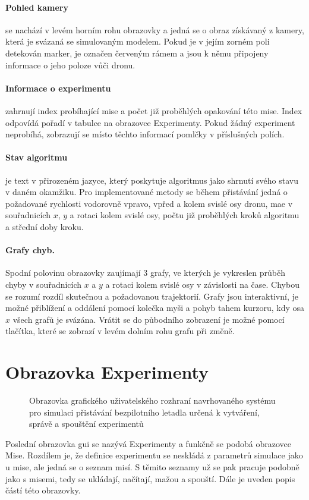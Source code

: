         \paragraph{ Pohled kamery} se nachází v levém horním rohu obrazovky a jedná se o obraz získávaný z kamery, která je svázaná se simulovaným modelem. Pokud je v jejím zorném poli detekován marker, je označen červeným rámem a jsou k němu připojeny informace o jeho poloze vůči dronu.

        \paragraph{ Informace o experimentu} zahrnují index probíhající mise a počet již proběhlých opakování této mise. Index odpovídá pořadí v tabulce na obrazovce Experimenty. Pokud žádný experiment neprobíhá, zobrazují se místo těchto informací pomlčky v příslušných polích.

        \paragraph{ Stav algoritmu} je text v přirozeném jazyce, který poskytuje algoritmus jako shrnutí svého stavu v daném okamžiku. Pro implementované metody se během přistávání jedná o požadované rychlosti vodorovně vpravo, vpřed a kolem svislé osy dronu, \acrshort{mae} v souřadnicích $x$, $y$ a rotaci kolem svislé osy, počtu již proběhlých kroků algoritmu a střední doby kroku.

        \paragraph{ Grafy chyb.} Spodní polovinu obrazovky zaujímají 3 grafy, ve kterých je vykreslen průběh chyby v souřadnicích $x$ a $y$ a rotaci kolem svislé osy v závislosti na čase. Chybou se rozumí rozdíl skutečnou a požadovanou trajektorií. Grafy jsou interaktivní, je možné přiblížení a oddálení pomocí kolečka myši a pohyb tahem kurzoru, kdy osa $x$ všech grafů je svázána. Vrátit se do půbodního zobrazení je možné pomocí tlačítka, které se zobrazí v levém dolním rohu grafu při změně.
    \section{Obrazovka Experimenty} \label{sec:experimenty}
        \begin{figure}
            \centering
            
            \caption[GUI: Obrazovka ]{Obrazovka  grafického uživatelského rozhraní navrhovaného systému pro simulaci přistávání bezpilotního letadla určená k vytváření, správě a spouštění experimentů}
            \label{fig:tabExperimenty}
        \end{figure}
        Poslední obrazovka \acrshort{gui} se nazývá Experimenty a funkčně se podobá obrazovce Mise. Rozdílem je, že definice experimentu se neskládá z parametrů simulace jako u mise, ale jedná se o seznam misí. S těmito seznamy už se pak pracuje podobně jako s misemi, tedy se ukládají, načítají, mažou a spouští. Dále je uveden popis částí této obrazovky.
